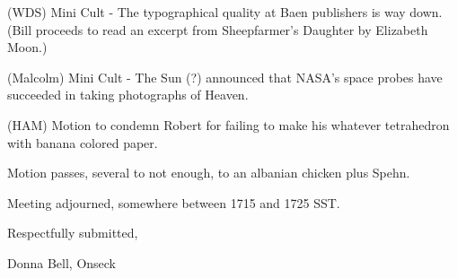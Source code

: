 \documentclass[12pt]{article}
\begin{document}
(WDS) Mini Cult - The typographical quality at Baen publishers is way down. (Bill proceeds to read an excerpt from Sheepfarmer's Daughter by Elizabeth Moon.)

(Malcolm) Mini Cult - The Sun (?) announced that NASA's space probes have succeeded in taking photographs of Heaven.

(HAM) Motion to condemn Robert for failing to make his whatever tetrahedron with banana colored paper.

Motion passes, several to not enough, to an albanian chicken plus Spehn.

\vspace{12pt}

\noindent
Meeting adjourned, somewhere between 1715 and 1725 SST.

\vspace{18pt}

\centerline{Respectfully submitted,}
\centerline{Donna Bell, Onseck}
\end{document}
